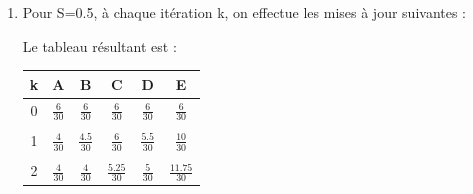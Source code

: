\begin{enumerate}
    \item Pour S=0.5, à chaque itération k, on effectue les mises à jour suivantes :

    Le tableau résultant est :
    \begin{center}
        \begin{tabular}{c|ccccc}
        k & A & B & C & D & E\\ \hline
    	0 & $\frac{6}{30}$ & $\frac{6}{30}$ & $\frac{6}{30}$ & $\frac{6}{30}$ & $\frac{6}{30}$\\ \\
    	1 & $\frac{4}{30}$ & $\frac{4.5}{30}$ & $\frac{6}{30}$ & $\frac{5.5}{30}$ & $\frac{10}{30}$\\ \\
    	2 & $\frac{4}{30}$ & $\frac{4}{30}$ & $\frac{5.25}{30}$ & $\frac{5}{30}$ & $\frac{11.75}{30}$\\
    	\end{tabular}
    \end{center}


\end{enumerate}
